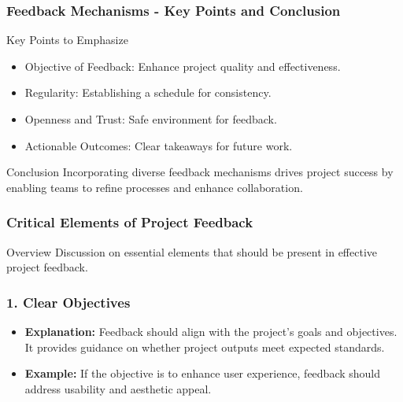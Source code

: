 \documentclass[aspectratio=169]{beamer}
\begin{document}
\begin{frame}[fragile]
    \frametitle{Feedback Mechanisms - Key Points and Conclusion}
    \begin{block}{Key Points to Emphasize}
        \begin{itemize}
            \item Objective of Feedback: Enhance project quality and effectiveness.
            \item Regularity: Establishing a schedule for consistency.
            \item Openness and Trust: Safe environment for feedback.
            \item Actionable Outcomes: Clear takeaways for future work.
        \end{itemize}
    \end{block}
    
    \begin{block}{Conclusion}
        Incorporating diverse feedback mechanisms drives project success by enabling teams to refine processes and enhance collaboration.
    \end{block}
\end{frame}

\begin{frame}[fragile]
    \frametitle{Critical Elements of Project Feedback}
    \begin{block}{Overview}
        Discussion on essential elements that should be present in effective project feedback.
    \end{block}
\end{frame}

\begin{frame}[fragile]
    \frametitle{1. Clear Objectives}
    \begin{itemize}
        \item \textbf{Explanation:} Feedback should align with the project's goals and objectives. 
        It provides guidance on whether project outputs meet expected standards.
        \item \textbf{Example:} If the objective is to enhance user experience, feedback should address usability and aesthetic appeal.
    \end{itemize}
\end{frame}
\end{document}
